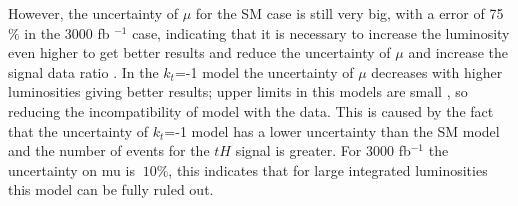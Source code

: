 \begin{linenumbers}
	
	
	However, the uncertainty of $\mu$ for the SM case is still very big, with a error of 75 $\%$ in the 3000 fb $^{-1}$ case, indicating that it is necessary to increase the luminosity even higher to get better results and reduce the uncertainty of $\mu$ and increase the signal data ratio . 
	In the $k_t$=-1 model the uncertainty of $\mu$ decreases with higher luminosities  giving better results; upper limits in this models are small , so reducing the incompatibility of model with the data. This is caused by the fact that the uncertainty of $k_t$=-1 model has a lower uncertainty than the SM model and the number of events for the $tH$ signal is greater. For 3000 fb$^{-1}$ the uncertainty on mu is $~10\%$, this indicates that for large integrated luminosities this model can be fully ruled out.
	
\end{linenumbers}

